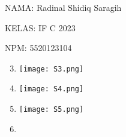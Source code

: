 \documentclass[8pt, a4paper]{article}
\date{}
\newcommand{\lstinputwithcaption}[2]{%
    }
\begin{document}
      NAMA: Radinal Shidiq Saragih

      KELAS: IF C 2023

      NPM: 5520123104

      \begin{enumerate}
      \setcounter{enumi}{2}
        \item 

          \begin{multicols}{2}
            \begin{center}
            \lstinputwithcaption{./code/src/soal3/Main.java}{Main.java}
              \texttt{[image: S3.png]}
            \end{center}
          \end{multicols}

        \item 

          \begin{multicols}{2}
            \begin{center}
              \lstinputwithcaption{./code/src/soal4/Main.java}{Main.java}
              \texttt{[image: S4.png]}
            \end{center}
          \end{multicols}

        \newpage

        \item 

          \begin{multicols}{2}
            \begin{center}

              \lstinputwithcaption{./code/src/soal5/Main.java}{Main.java}

              \columnbreak

              \texttt{[image: S5.png]}

            \end{center}
          \end{multicols}

        \newpage

        \item 

          \begin{multicols}{2}
            \begin{center}

              \lstinputwithcaption{./code/src/soal6/Main.java}{Main.java}

              \columnbreak


\end{center}
\end{multicols}
\end{enumerate}
\end{document}
